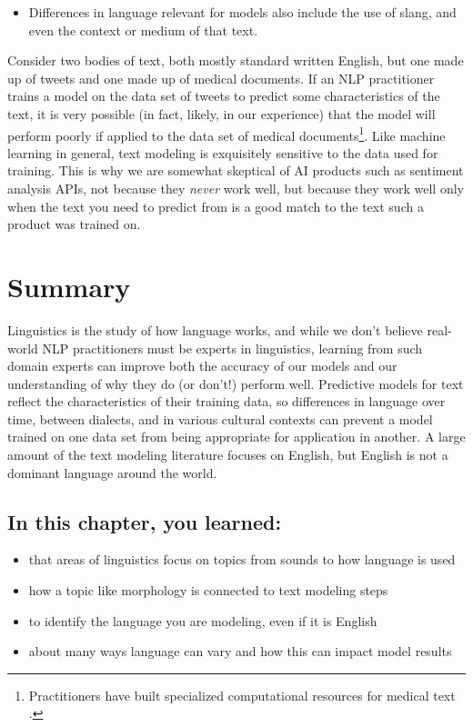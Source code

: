 \documentclass[
]{krantz}
\newenvironment{rmdblock}[1]
  {\begin{shaded*}
  \begin{itemize}[left = -1cm, labelsep = 1cm]
  \renewcommand{\labelitemi}{
    \raisebox{-.7\height}[0pt][0pt]{
      {\setkeys{Gin}{width=3em,keepaspectratio}\texttt{[image: images/\#1]}}
    }
  }
 
  \item
  }
  {
  \end{itemize}
  \end{shaded*}
  }
\newenvironment{rmdwarning}
  {\begin{rmdblock}{warning}}
  {\end{rmdblock}}
\begin{document}
\begin{rmdwarning}
Differences in language relevant for models also include the use of
slang, and even the context or medium of that text.
\end{rmdwarning}

Consider two bodies of text, both mostly standard written English, but one made up of tweets and one made up of medical documents. If an NLP practitioner trains a model on the data set of tweets to predict some characteristics of the text, it is very possible (in fact, likely, in our experience) that the model will perform poorly if applied to the data set of medical documents\footnote{Practitioners have built specialized computational resources for medical text \citep{Johnson1999}.}. Like machine learning in general, text modeling is exquisitely sensitive to the data used for training. This is why we are somewhat skeptical of AI products such as sentiment analysis APIs, not because they \emph{never} work well, but because they work well only when the text you need to predict from is a good match to the text such a product was trained on.

\hypertarget{languagesummary}{%
\section{Summary}\label{languagesummary}}

Linguistics is the study of how language works, and while we don't believe real-world NLP practitioners must be experts in linguistics, learning from such domain experts can improve both the accuracy of our models and our understanding of why they do (or don't!) perform well. Predictive models for text reflect the characteristics of their training data, so differences in language over time, between dialects, and in various cultural contexts can prevent a model trained on one data set from being appropriate for application in another. A large amount of the text modeling literature focuses on English, but English is not a dominant language around the world.

\hypertarget{in-this-chapter-you-learned}{%
\subsection{In this chapter, you learned:}\label{in-this-chapter-you-learned}}

\begin{itemize}
\item
  that areas of linguistics focus on topics from sounds to how language is used
\item
  how a topic like morphology is connected to text modeling steps
\item
  to identify the language you are modeling, even if it is English
\item
  about many ways language can vary and how this can impact model results
\end{itemize}
\end{document}
